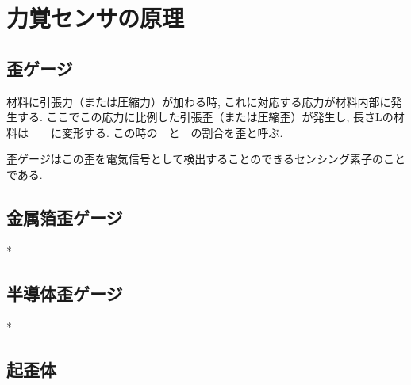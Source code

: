 \section{力覚センサの原理}
\subsection{歪ゲージ}
材料に引張力（または圧縮力）が加わる時, これに対応する応力が材料内部に発生する.
ここでこの応力に比例した引張歪（または圧縮歪）が発生し, 長さLの材料は　　に変形する.
この時の　と　の割合を歪と呼ぶ. 

歪ゲージはこの歪を電気信号として検出することのできるセンシング素子のことである. 


\subsection{金属箔歪ゲージ}*
\subsection{半導体歪ゲージ}*

\subsection{起歪体}



